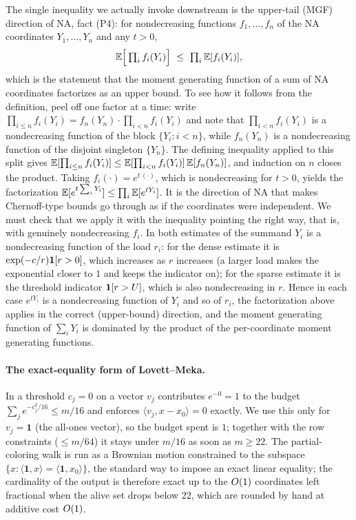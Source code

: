 The single inequality we actually invoke downstream is the upper-tail (MGF) direction of NA, fact (P4): for nondecreasing
functions $f_1,\dots,f_n$ of the NA coordinates $Y_1,\dots,Y_n$ and any $t>0$,
\[
  \E\Big[\textstyle\prod_i f_i(Y_i)\Big]\ \le\ \prod_i\E[f_i(Y_i)],
\]
which is the statement that the moment generating function of a sum of NA coordinates factorizes as an upper bound. To see how
it follows from the definition, peel off one factor at a time: write $\prod_{i\le n}f_i(Y_i)=f_n(Y_n)\cdot\prod_{i<n}f_i(Y_i)$
and note that $\prod_{i<n}f_i(Y_i)$ is a nondecreasing function of the block $\{Y_i:i<n\}$, while $f_n(Y_n)$ is a
nondecreasing function of the disjoint singleton $\{Y_n\}$. The defining inequality applied to this split gives
$\mathbb{E}[\prod_{i\le n}f_i(Y_i)]\le\mathbb{E}[\prod_{i<n}f_i(Y_i)]\,\mathbb{E}[f_n(Y_n)]$, and induction on $n$ closes the product. Taking
$f_i(\cdot)=e^{t\,(\cdot)}$, which is nondecreasing for $t>0$, yields the factorization $\mathbb{E}[e^{t\sum_iY_i}]\le\prod_i\mathbb{E}[e^{t
Y_i}]$. It is the direction of NA that makes Chernoff-type bounds go through as if the coordinates were independent. We must
check that we apply it with the inequality pointing the right way, that is, with genuinely nondecreasing $f_i$. In both estimates of
 the summand $Y_i$ is a nondecreasing function of the load $r_i$: for the dense estimate it is
$\exp(-c/r)\mathbf{1}[r>0]$, which increases as $r$ increases (a larger load makes the exponential closer to $1$ and keeps the
indicator on); for the sparse estimate it is the threshold indicator $\mathbf{1}[r>U]$, which is also nondecreasing in $r$. Hence in
each case $e^{tY_i}$ is a nondecreasing function of $Y_i$ and so of $r_i$, the factorization above applies in the correct
(upper-bound) direction, and the moment generating function of $\sum_i Y_i$ is dominated by the product of the per-coordinate
moment generating functions.

\paragraph{The exact-equality form of Lovett--Meka.}
In  a threshold $c_j=0$ on a vector $v_j$ contributes $e^{-0}=1$ to the budget $\sum_j e^{-c_j^2/16}\le m/16$ and
enforces $\langle v_j,x-x_0\rangle=0$ exactly. We use this only for $v_j=\mathbf 1$ (the all-ones vector), so the budget
spent is $1$; together with the row constraints ($\le m/64$) it stays under $m/16$ as soon as $m\ge 22$. The partial-coloring
walk is run as a Brownian motion constrained to the subspace $\{x:\langle\mathbf 1,x\rangle=\langle\mathbf 1,x_0\rangle\}$,
the standard way to impose an exact linear equality; the cardinality of the output is therefore exact up to the $O(1)$
coordinates left fractional when the alive set drops below $22$, which are rounded by hand at additive cost $O(1)$.

